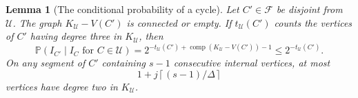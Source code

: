 \documentclass[11pt,a4paper]{article}
\numberwithin{equation}{section}
\newtheorem{lemma}[theorem]{Lemma}
\theoremstyle{definition}
\theoremstyle{remark}
\newcommand{\Prob}{\mathbb P}
\newcommand{\cc}{\operatorname{comp}}
\newcommand{\ceil}[1]{\left\lceil#1\right\rceil}
\begin{document}
\begin{lemma}[The conditional probability of a cycle]\label{lem:conditional-cycle}
Let $C'\in\mathcal F$ be disjoint from $\mathcal U$. The graph $K_{\mathcal U}-V(C')$ is connected or empty. If $t_{\mathcal U}(C')$ counts the vertices of $C'$ having degree three in $K_{\mathcal U}$, then
\begin{equation}\label{eq:conditional-probability}
 \Prob(I_{C'}\mid I_C\text{ for }C\in\mathcal U)
 =2^{-t_{\mathcal U}(C')+\cc(K_{\mathcal U}-V(C'))-1}
 \le2^{-t_{\mathcal U}(C')}.
\end{equation}
On any segment of $C'$ containing $s-1$ consecutive internal vertices, at most
\begin{equation}\label{eq:effective-ports}
 1+j\ceil{(s-1)/\Delta}
\end{equation}
vertices have degree two in $K_{\mathcal U}$.
\end{lemma}
\end{document}
